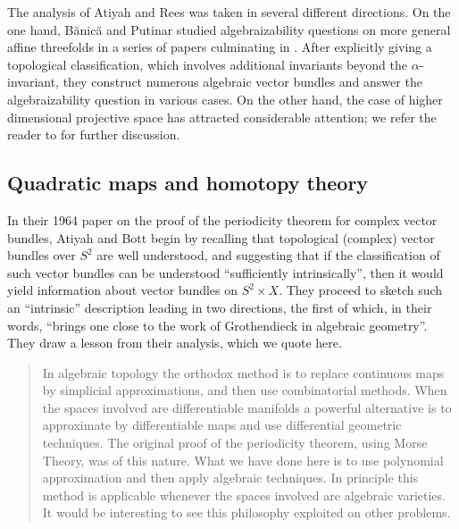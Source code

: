 \documentclass[11pt,leqno]{article}
\renewcommand{\1}{{\rm 1\hspace*{-0.4ex}%
\rule{0.1ex}{1.52ex}\hspace*{0.2ex}}}
\newcommand{\<}[1]{{\langle}#1 {\rangle}}
\theoremstyle{plain}
\theoremstyle{definition}
\theoremstyle{remark}
\numberwithin{equation}{subsection}
\begin{document}
The analysis of Atiyah and Rees was taken in several different directions.  On the one hand, B{\u{a}}nic{\u{a}} and Putinar studied algebraizability questions on more general affine threefolds in a series of papers culminating in  \cite{BanicaPutinar1987VectorBundlesP3}.  After explicitly giving a topological classification, which involves additional invariants beyond the $\alpha$-invariant, they construct numerous algebraic vector bundles and answer the algebraizability question in various cases.  On the other hand, the case of higher dimensional projective space has attracted considerable attention; we refer the reader to \cite{OSS} for further discussion.






\subsection{Quadratic maps and homotopy theory}
\label{ss:quadraticmaps}
In their 1964 paper on the proof of the periodicity theorem for complex vector bundles, Atiyah and Bott \cite{AtiyahBott1964Bott} begin by recalling that topological (complex) vector bundles over $S^2$ are well understood, and suggesting that if the classification of such vector bundles can be understood ``sufficiently intrinsically'', then it would yield information about vector bundles on $S^2 \times X$.  They proceed to sketch such an ``intrinsic'' description leading in two directions, the first of which, in their words, ``brings one close to the work of Grothendieck in algebraic geometry''.  They draw a lesson from their analysis, which we quote here.

\begin{quote}
	In algebraic topology the orthodox method is to replace continuous maps by simplicial approximations, and then use combinatorial methods. When the spaces involved are differentiable manifolds a powerful alternative is to approximate by differentiable maps and use differential geometric techniques. The original proof of the periodicity theorem, using Morse Theory, was of this nature. What we have done here is to use polynomial approximation and then apply algebraic techniques. In principle this method is applicable whenever the spaces involved are algebraic varieties. It would be interesting to see this philosophy exploited on other problems.
\end{quote}
\end{document}
